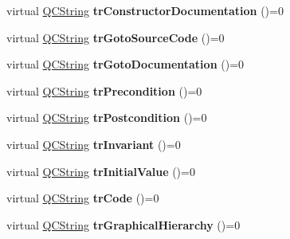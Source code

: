\begin{DoxyCompactItemize}
\item 
\hypertarget{class_translator_aa68bf667a9f90891389993066036c115}{virtual \hyperlink{class_q_c_string}{Q\-C\-String} {\bfseries tr\-Constructor\-Documentation} ()=0}\label{class_translator_aa68bf667a9f90891389993066036c115}

\item 
\hypertarget{class_translator_ad0ffc15f25791db56138c5929da1250d}{virtual \hyperlink{class_q_c_string}{Q\-C\-String} {\bfseries tr\-Goto\-Source\-Code} ()=0}\label{class_translator_ad0ffc15f25791db56138c5929da1250d}

\item 
\hypertarget{class_translator_a91f4a2f28940c0dc0a46f8ba7a7e7dc5}{virtual \hyperlink{class_q_c_string}{Q\-C\-String} {\bfseries tr\-Goto\-Documentation} ()=0}\label{class_translator_a91f4a2f28940c0dc0a46f8ba7a7e7dc5}

\item 
\hypertarget{class_translator_a31ef5cfc631ef75a7378d1bdf01a3de2}{virtual \hyperlink{class_q_c_string}{Q\-C\-String} {\bfseries tr\-Precondition} ()=0}\label{class_translator_a31ef5cfc631ef75a7378d1bdf01a3de2}

\item 
\hypertarget{class_translator_a8572b4ab810c1558e421f285b0aba007}{virtual \hyperlink{class_q_c_string}{Q\-C\-String} {\bfseries tr\-Postcondition} ()=0}\label{class_translator_a8572b4ab810c1558e421f285b0aba007}

\item 
\hypertarget{class_translator_a58cdde0c5ffe5ed4b513b2613d1aae70}{virtual \hyperlink{class_q_c_string}{Q\-C\-String} {\bfseries tr\-Invariant} ()=0}\label{class_translator_a58cdde0c5ffe5ed4b513b2613d1aae70}

\item 
\hypertarget{class_translator_a168c7699b30781af79718206ae8d871d}{virtual \hyperlink{class_q_c_string}{Q\-C\-String} {\bfseries tr\-Initial\-Value} ()=0}\label{class_translator_a168c7699b30781af79718206ae8d871d}

\item 
\hypertarget{class_translator_acce676fe63940b2759ae11c1a88d1c75}{virtual \hyperlink{class_q_c_string}{Q\-C\-String} {\bfseries tr\-Code} ()=0}\label{class_translator_acce676fe63940b2759ae11c1a88d1c75}

\item 
\hypertarget{class_translator_adaa3ab95f5a0f45095512b528033a93e}{virtual \hyperlink{class_q_c_string}{Q\-C\-String} {\bfseries tr\-Graphical\-Hierarchy} ()=0}\label{class_translator_adaa3ab95f5a0f45095512b528033a93e}


\end{DoxyCompactItemize}
